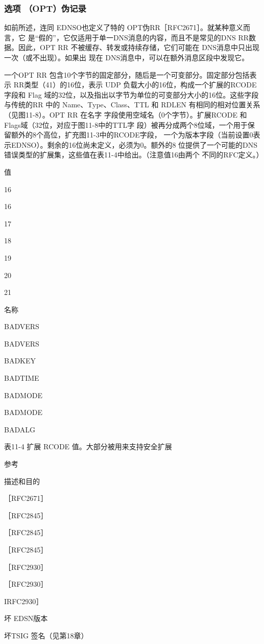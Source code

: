 \subsubsection{选项 （OPT）伪记录}

如前所述，连同 EDNSO也定义了特的 OPT伪RR［RFC2671］。就某种意义而言，它
是“假的”，它仅适用于单一DNS消息的内容，而且不是常见的DNS RR数据。因此，OPT
RR 不被缓存、转发或持续存储，它们可能在 DNS消息中只出现一次（或不出现）。如果出
现在 DNS消息中，可以在额外消息区段中发现它。

一个OPT RR 包含10个字节的固定部分，随后是一个可变部分。固定部分包括表示
RR类型（41）的16位，表示 UDP 负载大小的16位，构成一个扩展的RCODE 字段和 Flag
域的32位，以及指出以字节为单位的可变部分大小的16位。这些字段与传统的RR 中的
Name、Type、Class、TTL 和 RDLEN 有相同的相对位置关系（见图11-8）。OPT RR 在名字
字段使用空域名（0个字节）。扩展RCODE 和Flags域（32位，对应于图11-8中的TTL字
段）被再分成两个8位域，一个用于保留额外的8个高位，扩充图11-3中的RCODE字段，
一个为版本字段（当前设置0表示EDNSO）。剩余的16位尚未定义，必须为0。额外的8
位提供了一个可能的DNS错误类型的扩展集，这些值在表11-4中给出。（注意值16由两个
不同的RFC定义。）

值

16

16

17

18

19

20

21

名称

BADVERS

BADVERS

BADKEY

BADTIME

BADMODE

BADMODE

BADALG

表11-4 扩展 RCODE 值。大部分被用来支持安全扩展

参考

描述和目的

［RFC2671］

［RFC2845］

［RFC2845］

［RFC2845］

［RFC2930］

［RFC2930］

IRFC2930］

坏 EDSN版本

坏TSIG 签名（见第18章）

